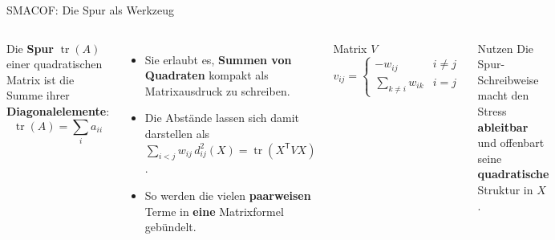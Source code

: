 \begin{frame}{SMACOF: Die Spur als Werkzeug}
\begin{columns}
Die \textbf{Spur} $\operatorname{tr}(A)$ einer quadratischen Matrix ist die
Summe ihrer \textbf{Diagonalelemente}:
\[
  \operatorname{tr}(A) = \sum_{i} a_{ii}
\]

\begin{itemize}
  \item Sie erlaubt es, \textbf{Summen von Quadraten} kompakt als
        Matrixausdruck zu schreiben.
  \item Die Abstände lassen sich damit darstellen als
        $\sum_{i<j} w_{ij}\, d_{ij}^2(X) = \operatorname{tr}(X^{\mathsf{T}} V X)$.
  \item So werden die vielen \textbf{paarweisen} Terme in \textbf{eine}
        Matrixformel gebündelt.
\end{itemize}

\begin{blockC2}{Matrix $V$}
\[
  v_{ij} =
  \begin{cases}
    -w_{ij} & i \neq j\\[2pt]
    \sum_{k \neq i} w_{ik} & i = j
  \end{cases}
\]
\end{blockC2}

\begin{blockC1}{Nutzen}
Die Spur-Schreibweise macht den Stress \textbf{ableitbar} und offenbart
seine \textbf{quadratische} Struktur in $X$.
\end{blockC1}
\end{columns}


\end{frame}

